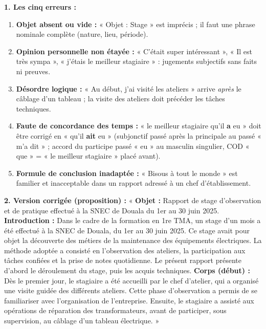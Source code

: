 \documentclass[11pt]{article}
\begin{document}
\begin{corrige}
\textbf{1. Les cinq erreurs :}
\begin{enumerate}
    \item \textbf{Objet absent ou vide :} « Objet : Stage » est imprécis ; il faut une phrase nominale complète (nature, lieu, période).
    \item \textbf{Opinion personnelle non étayée :} « C'était super intéressant », « Il est très sympa », « j'étais le meilleur stagiaire » : jugements subjectifs sans faits ni preuves.
    \item \textbf{Désordre logique :} « Au début, j'ai visité les ateliers » arrive \emph{après} le câblage d'un tableau ; la visite des ateliers doit précéder les tâches techniques.
    \item \textbf{Faute de concordance des temps :} « le meilleur stagiaire qu'il \textbf{a} eu » doit être corrigé en « qu'il \textbf{ait} eu » (subjonctif passé après la principale au passé « m'a dit » ; accord du participe passé « eu » au masculin singulier, COD « que » = « le meilleur stagiaire » placé avant).
    \item \textbf{Formule de conclusion inadaptée :} « Bisous à tout le monde » est familier et inacceptable dans un rapport adressé à un chef d'établissement.
\end{enumerate}
\textbf{2. Version corrigée (proposition) :}
« \textbf{Objet :} Rapport de stage d'observation et de pratique effectué à la SNEC de Douala du 1er au 30 juin 2025.
\textbf{Introduction :} Dans le cadre de la formation en 1re TMA, un stage d'un mois a été effectué à la SNEC de Douala, du 1er au 30 juin 2025. Ce stage avait pour objet la découverte des métiers de la maintenance des équipements électriques. La méthode adoptée a consisté en l'observation des ateliers, la participation aux tâches confiées et la prise de notes quotidienne. Le présent rapport présente d'abord le déroulement du stage, puis les acquis techniques.
\textbf{Corps (début) :} Dès le premier jour, le stagiaire a été accueilli par le chef d'atelier, qui a organisé une visite guidée des différents ateliers. Cette phase d'observation a permis de se familiariser avec l'organisation de l'entreprise. Ensuite, le stagiaire a assisté aux opérations de réparation des transformateurs, avant de participer, sous supervision, au câblage d'un tableau électrique. »
\end{corrige}
\end{document}
